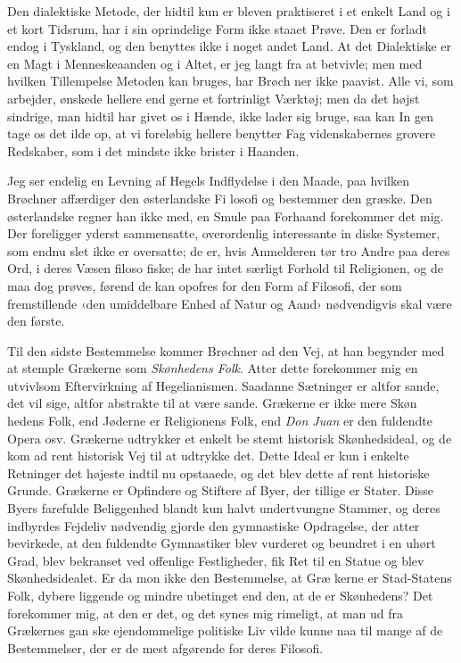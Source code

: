 \documentclass[12pt,a4paper,openany]{book}
\newcommand{\opage}[1]{\marginnote{\footnotesize\textit{[#1]}}}
\begin{document}
Den dialektiske Metode, der hidtil kun er bleven praktiseret
i et enkelt Land og i et kort Tidsrum, har i sin oprindelige
Form ikke staaet Prøve. Den er forladt endog i Tyskland, og
den benyttes ikke i noget andet Land. At det Dialektiske er en
Magt i Menneskeaanden og i Altet, er jeg langt fra at betvivle;
men med hvilken Tillempelse Metoden kan bruges, har Brøch\-%
ner ikke paavist. Alle vi, som arbejder, ønskede hellere end
gerne et fortrinligt Værktøj; men da det højst sindrige, man
hidtil har givet os i Hænde, ikke lader sig bruge, saa kan In\-%
gen tage os det ilde op, at vi foreløbig hellere benytter Fag\-%
videnskabernes grovere Redskaber, som i det mindste ikke brister
i Haanden.

Jeg ser endelig en Levning af Hegels Indflydelse i den
Maade, paa hvilken Brøchner affærdiger den østerlandske Fi\-%
losofi og bestemmer den græske. Den østerlandske regner
han ikke med, en Smule paa Forhaand forekommer det mig.
Der foreligger yderst sammensatte, overordenlig interessante in\-%
diske Systemer, som endnu slet ikke er oversatte; de er, hvis
Anmelderen tør tro Andre paa deres Ord, i deres Væsen filoso\-%
fiske; de har intet særligt Forhold til Religionen, og de maa
dog prøves, førend de kan opofres for den Form af Filosofi,
der som fremstillende ‹den umiddelbare Enhed af Natur og
Aand› nødvendigvis skal være den første.

Til den sidste Bestemmelse kommer Brøchner ad den
Vej, at han begynder med at stemple Grækerne som \emph{Skønhedens
Folk}. Atter dette forekommer mig en utvivlsom Eftervirkning af
Hegelianismen. Saadanne Sætninger er altfor sande, det vil sige,
altfor abstrakte til at være sande. Grækerne er ikke mere Skøn\-%
hedens Folk, end Jøderne er Religionens Folk, end \emph{Don Juan}
er den fuldendte Opera osv. Grækerne udtrykker et enkelt be\-%
stemt historisk Skønhedsideal, og de kom ad rent historisk Vej
til at udtrykke det. Dette Ideal er kun i enkelte Retninger det
højeste indtil nu opstaaede, og det blev dette af rent historiske
Grunde. Grækerne er Opfindere og Stiftere af Byer, der tillige
er Stater. Disse Byers farefulde Beliggenhed blandt kun halvt
undertvungne Stammer, og deres indbyrdes Fejdeliv nødvendig\-%
gjorde den gymnastiske Opdragelse, der atter bevirkede, at den
fuldendte Gymnastiker blev vurderet og beundret i en uhørt Grad,
\opage{123}blev bekranset ved offenlige Festligheder, fik Ret til en Statue og
blev Skønhedsidealet. Er da mon ikke den Bestemmelse, at Græ\-%
kerne er Stad-Statens Folk, dybere liggende og mindre ubetinget
end den, at de er Skønhedens? Det forekommer mig, at den er
det, og det synes mig rimeligt, at man ud fra Grækernes gan\-%
ske ejendommelige politiske Liv vilde kunne naa til mange af de
Bestemmelser, der er de mest afgørende for deres Filosofi.
\end{document}
